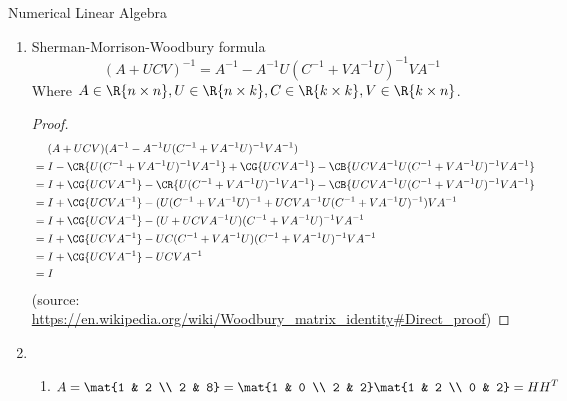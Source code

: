\documentclass{article}
\begin{document}
    {Numerical Linear Algebra}

    \begin{enumerate}
        \item {Sherman-Morrison-Woodbury formula
            \begin{displaymath}
                (A+UCV)^{-1} = A^{-1}-A^{-1}U(C^{-1}+VA^{-1}U)^{-1}VA^{-1}
            \end{displaymath}
            Where \(A\in\R{n\times n}, U\in\R{n\times k}, C\in\R{k\times k}, V\in\R{k\times n}\).
            \begin{proof}
                \begin{displaymath}
                    \begin{aligned}
                        &\phantom{\mbox{}=\mbox{}} (A+UCV)(A^{-1}-A^{-1}U(C^{-1}+VA^{-1}U)^{-1}VA^{-1}) \\
                        &= I - \CR{U(C^{-1}+VA^{-1}U)^{-1}VA^{-1}} + \CG{UCVA^{-1}} - \CB{UCVA^{-1}U(C^{-1}+VA^{-1}U)^{-1}VA^{-1}} \\
                        &= I + \CG{UCVA^{-1}} - \CR{U(C^{-1}+VA^{-1}U)^{-1}VA^{-1}} - \CB{UCVA^{-1}U(C^{-1}+VA^{-1}U)^{-1}VA^{-1}} \\
                        &= I + \CG{UCVA^{-1}} - (U(C^{-1}+VA^{-1}U)^{-1} + UCVA^{-1}U(C^{-1}+VA^{-1}U)^{-1})VA^{-1} \\
                        &= I + \CG{UCVA^{-1}} - (U + UCVA^{-1}U)(C^{-1}+VA^{-1}U)^{-1}VA^{-1} \\
                        &= I + \CG{UCVA^{-1}} - UC(C^{-1} + VA^{-1}U)(C^{-1}+VA^{-1}U)^{-1}VA^{-1} \\
                        &= I + \CG{UCVA^{-1}} - UCVA^{-1} \\
                        &= I \\
                    \end{aligned}
                \end{displaymath}
                (source: \url{https://en.wikipedia.org/wiki/Woodbury_matrix_identity#Direct_proof})
            \end{proof}
        }
        \item {
            \begin{enumerate}
                \item {
                    \begin{displaymath}
                        A = \mat{1 & 2 \\ 2 & 8} = \mat{1 & 0 \\ 2 & 2}\mat{1 & 2 \\ 0 & 2} = HH^T

\end{displaymath}}
\end{enumerate}}
\end{enumerate}
\end{document}
